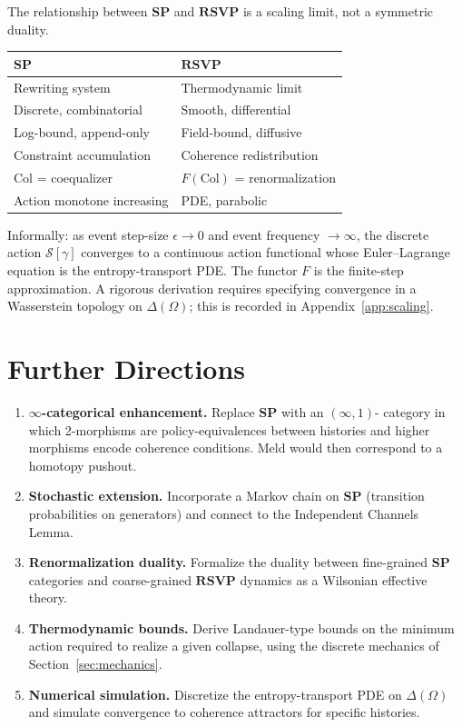 \documentclass[12pt,a4paper]{article}
\theoremstyle{definition}
\theoremstyle{remark}
\newcommand{\SP}{\mathbf{SP}}
\newcommand{\RSVP}{\mathbf{RSVP}}
\newcommand{\Col}{\ensuremath{\mathrm{Col}}}
\begin{document}
The relationship between $\SP$ and $\RSVP$ is a scaling limit, not a symmetric duality.

\begin{center}
\renewcommand{\arraystretch}{1.4}
\begin{tabular}{ll}
\toprule
\textbf{$\SP$} & \textbf{$\RSVP$} \\
\midrule
Rewriting system & Thermodynamic limit \\
Discrete, combinatorial & Smooth, differential \\
Log-bound, append-only & Field-bound, diffusive \\
Constraint accumulation & Coherence redistribution \\
$\Col$ = coequalizer & $F(\Col)$ = renormalization \\
Action monotone increasing & PDE, parabolic \\
\bottomrule
\end{tabular}
\end{center}

Informally: as event step-size $\epsilon\to 0$ and event frequency $\to\infty$,
the discrete action $\mathcal{S}[\gamma]$ converges to a continuous action functional
whose Euler--Lagrange equation is the entropy-transport PDE. The functor $F$ is the
finite-step approximation. A rigorous derivation requires specifying convergence in a
Wasserstein topology on $\Delta(\Omega)$; this is recorded in
Appendix~\ref{app:scaling}.

\section{Further Directions}
\label{sec:further}

\begin{enumerate}
\item \textbf{$\infty$-categorical enhancement.} Replace $\SP$ with an $(\infty,1)$-
  category in which 2-morphisms are policy-equivalences between histories and higher
  morphisms encode coherence conditions. Meld would then correspond to a homotopy pushout.
\item \textbf{Stochastic extension.} Incorporate a Markov chain on $\SP$ (transition
  probabilities on generators) and connect to the Independent Channels Lemma.
\item \textbf{Renormalization duality.} Formalize the duality between fine-grained
  $\SP$ categories and coarse-grained $\RSVP$ dynamics as a Wilsonian effective theory.
\item \textbf{Thermodynamic bounds.} Derive Landauer-type bounds on the minimum action
  required to realize a given collapse, using the discrete mechanics of
  Section~\ref{sec:mechanics}.
\item \textbf{Numerical simulation.} Discretize the entropy-transport PDE on $\Delta(\Omega)$
  and simulate convergence to coherence attractors for specific histories.
\end{enumerate}
\end{document}
